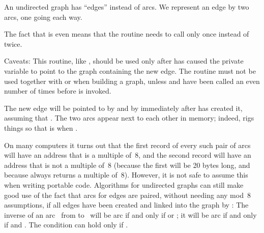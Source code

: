 An undirected graph has ``edges'' instead of arcs. We represent an edge
by two arcs, one going each way.

The fact that  is even means that the 
routine needs to call  only once instead of twice.

Caveats: This routine, like , should be used only after
 has caused the private variable  to
point to
the graph containing the new edge. The routine  must
not be used together with  or 
when
building a graph, unless  and 
have been
called an even number of times before  is invoked.

The new edge will be pointed to by  and by  immediately
after  has created it, assuming that . The
two arcs
appear next to each other in memory; indeed,  rigs things
so
that  is  when .

On many computers it turns out that the first  record of every such
pair of arcs will have an address that is a multiple of~8, and the
second  record will have an address that is not a multiple of~8
(because
the first  will be 20 bytes long, and because 
always returns
a multiple of~8). However, it is not safe to assume this when writing
portable code. Algorithms for undirected graphs can still make good use of
the fact that arcs for edges are paired, without needing any mod~8 assumptions,
if all edges have been created and linked into the graph by :
The inverse of an arc~ from  to~ will be arc  if and only if
 or ; it will be arc  if and only if  and
. The condition  can hold only if .

